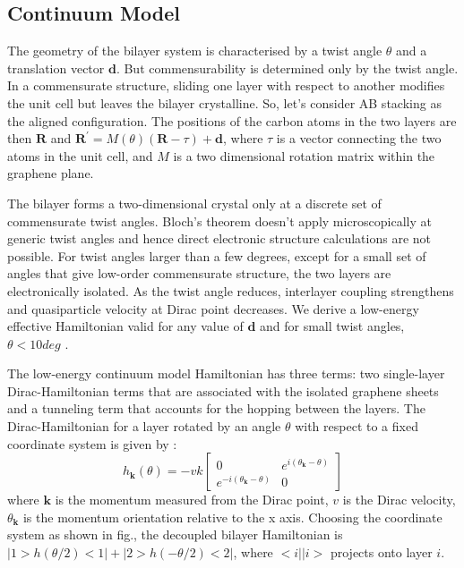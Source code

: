 \subsection{Continuum Model}
The geometry of the bilayer system is characterised by a twist angle $\theta$ and a translation vector $\boldsymbol{d}$. But commensurability is determined only by the twist angle. In a commensurate structure, sliding one layer with respect to another modifies the unit cell but leaves the bilayer crystalline. So, let's consider AB stacking as the aligned configuration. The positions of the carbon atoms in the two layers are then $\boldsymbol{R}$ and $\boldsymbol{R^{\prime}} = M(\theta)(\boldsymbol{R}-\tau)+\boldsymbol{d}$, where $\tau$ is a vector connecting the two atoms in the unit cell, and $M$ is a two dimensional rotation matrix within the graphene plane.

The bilayer forms a two-dimensional crystal only at a discrete set of commensurate twist angles. Bloch's theorem doesn't apply microscopically at generic twist angles and hence direct electronic structure calculations are not possible. For twist angles larger than a few degrees, except for a small set of angles that give low-order commensurate structure, the two layers are electronically isolated. As the twist angle reduces, interlayer coupling strengthens and quasiparticle velocity at Dirac point decreases. We derive a low-energy effective Hamiltonian valid for any value of $\boldsymbol{d}$ and for small twist angles, $\theta<10 deg$ \cite{Bistritzer12233}.

The low-energy continuum model Hamiltonian has three terms: two single-layer Dirac-Hamiltonian terms that are associated with the isolated graphene sheets and a tunneling term that accounts for the hopping between the layers. The Dirac-Hamiltonian for a layer rotated by an angle $\theta$ with respect to a fixed coordinate system is given by \cite{Geim}:
\begin{equation}
    h_{\boldsymbol{k}}(\theta)=-vk \begin{bmatrix}
        0 & e^{i(\theta_{\boldsymbol{k}}-\theta)}\\
        e^{-i(\theta_{\boldsymbol{k}}-\theta)} & 0 
    \end{bmatrix}
\end{equation}
where $\boldsymbol{k}$ is the momentum measured from the Dirac point, $v$ is the Dirac velocity, $\theta_{\boldsymbol{k}}$ is the momentum orientation relative to the x axis. Choosing the coordinate system as shown in fig., the decoupled bilayer Hamiltonian is $|1>h(\theta/2)<1|+|2>h(-\theta/2)<2|$, where $<i||i>$ projects onto layer $i$.



